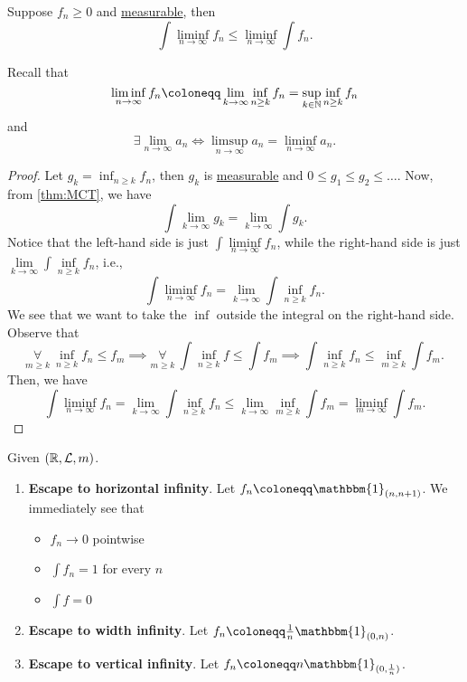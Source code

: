 \begin{theorem}\label{thm:Fatou-lemma}
	Suppose \(f_{n}\geq 0\) and \hyperref[def:measurable-function]{measurable}, then
	\[
		\int \liminf_{n \to \infty} f_{n}\leq \liminf_{n \to \infty} \int f_{n}.
	\]
\end{theorem}
\begin{remark}
	Recall that
	\[
		\liminf_{n \to \infty} f_{n} \coloneqq \lim\limits_{k \to \infty} \inf_{n\geq k}f_{n} = \sup _{k\in\mathbb{\MakeUppercase{n}} }\inf _{n\geq k}f_{n}
	\]
	and
	\[
		\exists\lim\limits_{n \to \infty} a_{n}\iff \limsup_{n \to \infty} a_{n} = \liminf_{n \to \infty} a_{n}.
	\]
\end{remark}
\begin{proof}
	Let \(g_{k} = \inf _{n\geq k}f_{n}\), then \(g_{k}\) is \hyperref[def:measurable-function]{measurable} and \(0\leq g_1 \leq g_2 \leq \ldots  \). Now, from \autoref{thm:MCT}, we have
	\[
		\int \lim\limits_{k \to \infty}  g_{k} = \lim\limits_{k \to \infty} \int g_{k}.
	\]
	Notice that the left-hand side is just \(\int \liminf\limits_{n \to \infty} f_{n}\), while the right-hand side is just \(\lim\limits_{k \to \infty} \int \inf\limits _{n\geq k}f_{n}\),
	i.e.,
	\[
		\int \liminf_{n \to \infty} f_{n} = \lim\limits_{k \to \infty} \int \inf _{n\geq k}f_{n}.
	\]
	We see that we want to take the \(\inf\) outside the integral on the right-hand side. Observe that
	\[
		\underset{m\geq k}{\forall }\ \inf _{n\geq k}f_{n}\leq f _{m} \implies \underset{m\geq k}{\forall }\ \int \inf _{n\geq k}f\leq \int f _{m}\implies \int \inf _{n\geq k}f_{n}\leq \inf_{m\geq k}\int f _{m}.
	\]
	Then, we have
	\[
		\int \liminf_{n \to \infty} f_{n} = \lim\limits_{k \to \infty} \int \inf _{n\geq k}f_{n}\leq \lim\limits_{k \to \infty} \inf _{m\geq k}\int f _{m} = \liminf_{m \to \infty} \int f _{m}.
	\]
\end{proof}

\begin{eg}
	Given \((\mathbb{\MakeUppercase{r}} , \mathcal{\MakeUppercase{l}} , m)\).
	\begin{enumerate}
		\item \textbf{Escape to horizontal infinity}. Let \(f_{n}\coloneqq \mathbbm{1}_{(n, n+1)} \). We immediately see that
		      \begin{itemize}
			      \item \(f_{n}\to 0\) pointwise
			      \item \(\int f_{n} = 1\) for every \(n\)
			      \item \(\int f = 0\)
		      \end{itemize}
		\item \textbf{Escape to width infinity}. Let \(f_{n}\coloneqq \frac{1}{n}\mathbbm{1}_{(0, n)} \).
		\item \textbf{Escape to vertical infinity}. Let \(f_{n}\coloneqq n \mathbbm{1}_{(0, \frac{1}{n})} \).
	\end{enumerate}
\end{eg}

